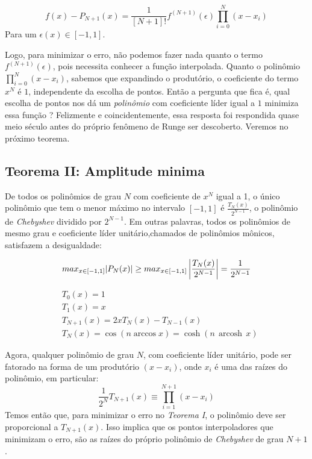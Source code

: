  \begin{equation}
 f(x) - P_{N+1}(x) = \frac{1}{[N+1]!}f^{(N+1)}(\epsilon)\prod^{N}_{i = 0} (x - x_i)
 \end{equation}
 Para um $\epsilon(x) \in [-1,1]$.
 
 Logo, para minimizar o erro, não podemos fazer nada quanto o termo $f^{(N+1)}(\epsilon)$, pois necessita conhecer a função interpolada. Quanto o polinômio $\prod^{N}_{i = 0} (x - x_i)$, sabemos que expandindo o produtório, o coeficiente do termo $x^N$ é $1$, independente da escolha de pontos. Então a pergunta que fica é, qual escolha de pontos nos dá um \emph{polinômio} com coeficiente líder igual a $1$ minimiza essa função ? Felizmente e coincidentemente, essa resposta foi respondida quase meio século antes do próprio fenômeno de Runge ser descoberto. Veremos no próximo teorema.

 
\subsection{Teorema II: Amplitude minima} \label{subsec:TeoremaII}
 De todos os polinômios de grau $N$ com coeficiente de $x^N$ igual a 1, o único polinômio que tem o menor máximo no intervalo $[-1,1]$ é $\frac{T_N(x)}{2^{N-1}}$, o polinômio de \emph{Chebyshev}  dividido por $2^{N-1}$. Em outras palavras, todos os polinômios de mesmo grau e coeficiente líder unitário,chamados de polinômios mônicos, satisfazem a desigualdade:

\begin{equation}
	max_{x \in [-1,1]}|P_N(x)| \geq  max_{x \in [-1,1]} \left |\frac{T_N(x)}{2^{N-1}}  \right |  = \frac{1}{2^{N-1}}\\
\end{equation}

\begin{align}
    &T_0(x) = 1\\
    &T_1(x) = x\\
    &T_{N+1}(x) = 2xT_N(x) - T_{N-1}(x)\\
    &T_{N}(x) =\cos(n \arccos x)=\cosh(n\,\operatorname{arcosh}\,x)
\end{align}

 Agora, qualquer polinômio de grau $N$, com coeficiente líder unitário, pode ser fatorado na forma de um produtório  $(x - x_i)$, onde $x_i$ é uma das raízes do polinômio, em particular: 
 \begin{equation}
 \frac{1}{2^N}T_{N+1}(x) \equiv \prod_{i = 1}^{N+1} (x-x_i)
 \end{equation}
 Temos então que, para minimizar o erro no \emph{Teorema I}, o polinômio deve ser proporcional a $T_{N+1}(x)$. Isso implica que  os pontos interpoladores que minimizam o erro, são as raízes do próprio polinômio de \emph{Chebyshev} de grau $N+1$.
 
